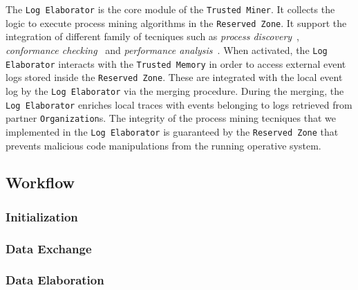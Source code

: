 The \texttt{Log Elaborator} is the core module of the \texttt{Trusted Miner}. It collects the logic to execute process mining algorithms in the \texttt{Reserved Zone}. It support the integration of different family of tecniques such as \textit{process discovery}~\cite{citation}, \textit{conformance checking}~\cite{citation} and \textit{performance analysis}~\cite{ciation}. When activated, the \texttt{Log Elaborator} interacts with the \texttt{Trusted Memory} in order to access external event logs stored inside the \texttt{Reserved Zone}. These are integrated with the local event log by the \texttt{Log Elaborator} via the merging procedure. During the merging, the \texttt{Log Elaborator} enriches local traces with events belonging to logs retrieved from partner \texttt{Organization}s. The integrity of the process mining tecniques that we implemented in the \texttt{Log Elaborator} is guaranteed by the \texttt{Reserved Zone} that prevents malicious code manipulations from the running operative system.








\subsection{Workflow}
\subsubsection{Initialization}
\subsubsection{Data Exchange}
\subsubsection{Data Elaboration}



